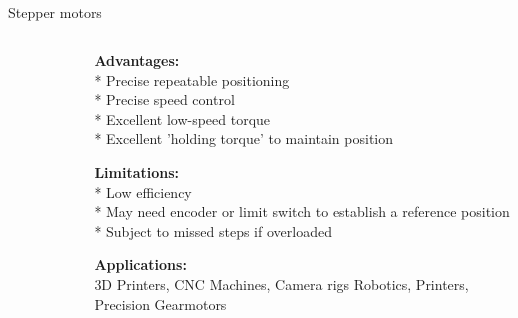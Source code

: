 \subsection{}
{
\begin{frame}{Stepper motors}

\begin{columns}
\begin{column}{0.4\textwidth}  %

	\vspace{-3mm}
   	\begin{figure}
 	\end{figure}

\end{column}

\begin{column}{0.6\textwidth}

{\bf Advantages:} \\
* Precise repeatable positioning \\
* Precise speed control \\
* Excellent low-speed torque \\
* Excellent 'holding torque' to maintain position


{\bf Limitations:} \\
* Low efficiency \\
* May need encoder or limit switch to establish a reference position \\
* Subject to missed steps if overloaded


{\bf Applications:} \\
3D Printers, 
CNC Machines, 
Camera rigs Robotics, 
Printers, 
Precision Gearmotors






\end{column}
\end{columns}
\end{frame}
}






